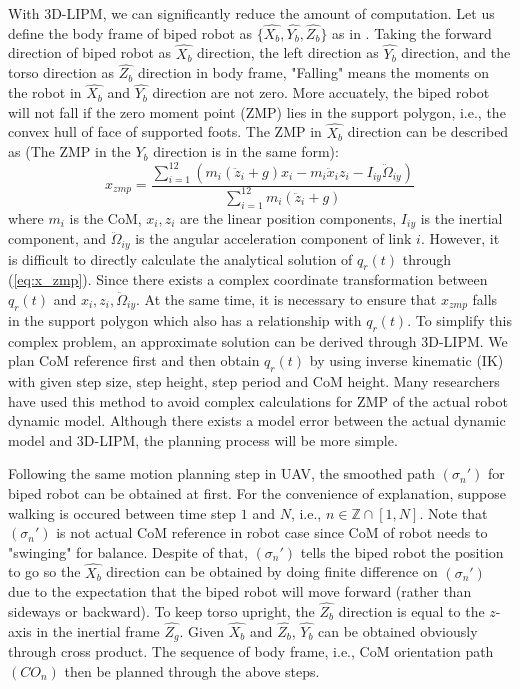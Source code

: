 \documentclass[journal,12pt,onecolumn,draftclsnofoot,]{IEEEtran}
\begin{document}
With 3D-LIPM, we can significantly reduce the amount of computation. Let us define the body frame of biped robot as $\{ \widehat{X_b}, \widehat{Y_b}, \widehat{Z_b} \}$ as in \cite{ourrobot}. Taking the forward direction of biped robot as $\widehat{X_b}$ direction, the left direction as $\widehat{Y_b}$ direction, and the torso direction as $\widehat{Z_b}$ direction in body frame, "Falling" means the moments on the robot in $\widehat{X_b}$ and $\widehat{Y_b}$ direction are not zero. More accuately, the biped robot will not fall if the zero moment point (ZMP) lies in the support polygon, i.e., the convex hull of face of supported foots. The ZMP in $\widehat{X_b}$ direction can be described as \cite{huang2001planning} (The ZMP in the $\widehat{Y_b}$ direction is in the same form):
\begin{equation} \label{eq:x_zmp}
    x_{zmp} = \frac{\sum_{i=1}^{12} (m_i(\ddot{z}_i+g)x_i - m_i\ddot{x}_iz_i - I_{iy}\ddot{\Omega}_{iy})}
                   {\sum_{i=1}^{12} m_i(\ddot{z}_i+g)}
\end{equation}
where $m_i$ is the CoM, $x_i, z_i$ are the linear position components, $I_{iy}$ is the inertial component, and $\ddot{\Omega}_{iy}$ is the angular acceleration component of link $i$. However, it is difficult to directly calculate the analytical solution of $q_r(t)$ through (\ref{eq:x_zmp}). Since there exists a complex coordinate transformation between $q_r(t)$ and $x_i, z_i, \ddot{\Omega}_{iy}$. At the same time, it is necessary to ensure that $x_{zmp}$ falls in the support polygon which also has a relationship with $q_r(t)$. To simplify this complex problem, an approximate solution can be derived through 3D-LIPM. We plan CoM reference first and then obtain $q_r(t)$ by using inverse kinematic (IK) with given step size, step height, step period and CoM height. Many researchers have used this method to avoid complex calculations for ZMP of the actual robot dynamic model. Although there exists a model error between the actual dynamic model and 3D-LIPM, the planning process will be more simple.

Following the same motion planning step in UAV, the smoothed path $(\sigma_n')$ for biped robot can be obtained at first. For the convenience of explanation, suppose walking is occured between time step $1$ and $N$, i.e., $n\in\mathbb{Z}\cap[1,N]$. Note that $(\sigma_n')$ is not actual CoM reference in robot case since CoM of robot needs to "swinging" for balance. Despite of that, $(\sigma_n')$ tells the biped robot the position to go so the $\widehat{X_b}$ direction can be obtained by doing finite difference on $(\sigma_n')$ due to the expectation that the biped robot will move forward (rather than sideways or backward). To keep torso upright, the $\widehat{Z_b}$ direction is equal to the $z$-axis in the inertial frame $\widehat{Z_g}$. Given $\widehat{X_b}$ and $\widehat{Z_b}$, $\widehat{Y_b}$ can be obtained obviously through cross product. The sequence of body frame, i.e., CoM orientation path $(CO_n)$ then be planned through the above steps.
\end{document}

